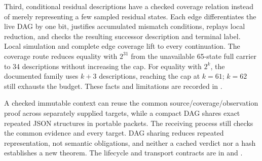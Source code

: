 Third, conditional residual descriptions have a checked coverage relation instead of merely representing a few sampled residual states. Each edge differentiates the live DAG by one bit, justifies accumulated mismatch conditions, replays local reduction, and checks the resulting successor description and terminal label. Local simulation and complete edge coverage lift to every continuation. The coverage route reduces equality with $2^{31}$ from the unavailable 65-state full carrier to 34 descriptions without increasing the cap. For equality with $2^k$, the documented family uses $k+3$ descriptions, reaching the cap at $k=61$; $k=62$ still exhausts the budget. These facts and limitations are recorded in .

A checked immutable context can reuse the common source/coverage/observation proof across separately supplied targets, while a compact DAG shares exact repeated JSON structures in portable packets. The receiving process still checks the common evidence and every target. DAG sharing reduces repeated representation, not semantic obligations, and neither a cached verdict nor a hash establishes a new theorem. The lifecycle and transport contracts are in  and .
